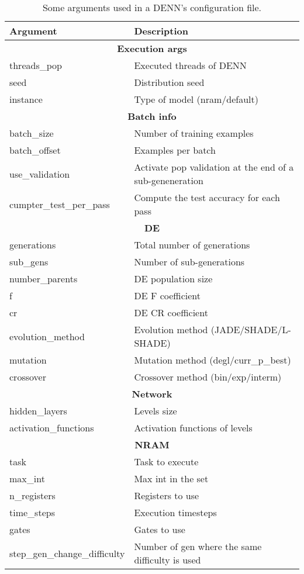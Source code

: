 \begin{table}[]
\centering
\label{my-label}
\begin{tabular}{|l|l|}
\hline
Argument     & Description \\ \hline \hline

\multicolumn{2}{|c|}{\textbf{Execution args}} \\ \hline
threads\_pop & Executed threads of DENN \\ \hline
seed     	 & Distribution seed \\ \hline
instance		 & Type of model (nram/default) \\ \hline \hline

\multicolumn{2}{|c|}{\textbf{Batch info}} \\ \hline
batch\_size  	 & Number of training examples \\ \hline
batch\_offset	 & Examples per batch \\ \hline
use\_validation & Activate pop validation at the end of a sub-geneneration \\ \hline
cumpter\_test\_per\_pass     	 & Compute the test accuracy for each pass \\ \hline \hline

\multicolumn{2}{|c|}{\textbf{DE}} \\ \hline
generations  	 & Total number of generations \\ \hline
sub\_gens  	 	& Number of sub-generations \\ \hline
number\_parents  	 	& DE population size \\ \hline
f						& DE F coefficient \\ \hline
cr						& DE CR coefficient \\ \hline
evolution\_method 		& Evolution method (JADE/SHADE/L-SHADE) \\ \hline
mutation 				& Mutation method (degl/curr\_p\_best) \\ \hline
crossover				& Crossover method (bin/exp/interm) \\ \hline

\multicolumn{2}{|c|}{\textbf{Network}} \\ \hline
hidden\_layers  	 		& Levels size \\ \hline
activation\_functions  	& Activation functions of levels \\ \hline

\multicolumn{2}{|c|}{\textbf{NRAM}} \\ \hline
task  	 		& Task to execute \\ \hline
max\_int  		& Max int in the set \\ \hline
n\_registers  	& Registers to use \\ \hline
time\_steps  	& Execution timesteps \\ \hline
gates  			& Gates to use \\ \hline
step\_gen\_change\_difficulty & Number of gen where the same difficulty is used  \\ \hline

\end{tabular}
\caption{Some arguments used in a DENN's configuration file.}
\end{table}

